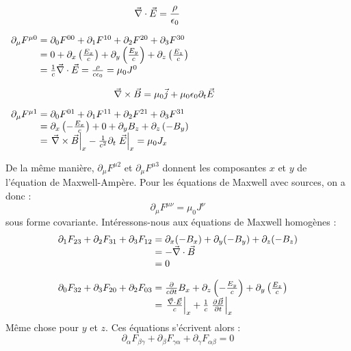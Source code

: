 \begin{minipage}{0.35\linewidth}
$$\vec{\nabla}\cdot\vec{E}=\frac{\rho}{\epsilon_0} \text{\hspace{1.5cm}}$$
\end{minipage}
\begin{minipage}{0.55\linewidth}
$
	\begin{array}{r@{\;}l}
		\partial_\mu F^{\mu 0}&=\partial_0F^{00}+\partial_1F^{10}+\partial_2F^{20}+\partial_3F^{30}\\
		&=0+\partial_x\left(\frac{E_x}{c}\right)+\partial_y\left(\frac{E_y}{c}\right)+\partial_z\left(\frac{E_z}{c}\right)\\
		&=\frac{1}{c}\nab\cdot\vec{E}=\frac{\rho}{c\epsilon_0}=\mu_0J^0
	\end{array}
$
\end{minipage}
\vspace{0.5cm}

\begin{minipage}{0.35\linewidth}
$$\vec{\nabla}\times\vec{B}=\mu_0\vec{j}+\mu_0\epsilon_0\partial_t\vec{E} \text{\hspace{1cm}}$$
\end{minipage}
\begin{minipage}{0.55\linewidth}
$
	\begin{array}{r@{\;}l}
		\partial_\mu F^{\mu 1}&=\partial_0F^{01}+\partial_1F^{11}+\partial_2F^{21}+\partial_3F^{31}\\
		&=\partial_x\left(-\frac{E_x}{c}\right)+0+\partial_yB_z+\partial_z\left(-B_y\right)\\
		&=\left.\nab\times\vec{B}\right|_x-\frac{1}{c^2}\partial_t\left.\vec{E}\right|_x=\mu_0J_x
	\end{array}
$
\end{minipage}
\vspace{0.5cm}

\noindent De la m\^eme manière, $\partial_\mu F^{\mu 2}$ et $\partial_\mu F^{\mu 3}$ donnent les composantes $x$ et $y$ de l'équation de Maxwell-Ampère.
Pour les équations de Maxwell avec sources, on a donc :
$$
	\boxed{\partial_\mu F^{\mu\nu}=\mu_0J^\nu}
$$
sous forme covariante. Intéressons-nous aux équations de Maxwell homogènes :
$$
	\begin{array}{r@{\;}l}
		\partial_1F_{23}+\partial_2F_{31}+\partial_3F_{12}&=\partial_x(-B_x)+\partial_y(-B_y)+\partial_z(-B_z)\\
			&= -\nab\cdot\vec{B}\\
			&= 0 \\[10pt]
		\partial_0F_{32}+\partial_3F_{20}+\partial_2F_{03}&=\frac{\partial}{c\partial t}B_x+\partial_z\left(-\frac{E_y}{c}\right)+\partial_y\left(\frac{E_z}{c}\right)\\
			&=\left.\frac{\nab\cdot\vec{E}}{c}\right|_x+\frac{1}{c}\left.\frac{\partial \vec{B}}{\partial t}\right|_x
	\end{array}
$$
M\^eme chose pour $y$ et $z$. Ces équations s'écrivent alors :
$$
	\boxed{\partial_\alpha F_{\beta\gamma} + \partial_\beta F_{\gamma\alpha} + \partial_\gamma F_{\alpha\beta} = 0}
$$

